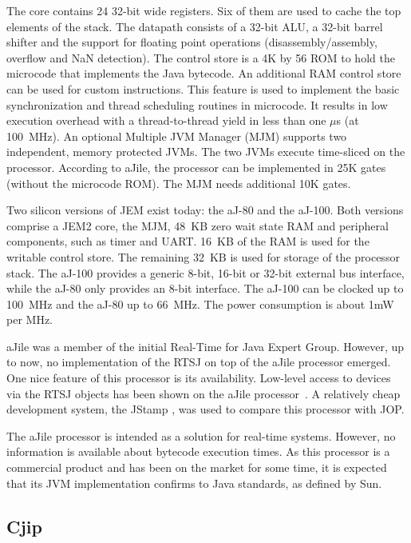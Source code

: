 The core contains 24 32-bit wide registers. Six of them are used to
cache the top elements of the stack. The datapath consists of a
32-bit ALU, a 32-bit barrel shifter and the support for floating
point operations (disassembly/assembly, overflow and NaN detection).
The control store is a 4K by 56 ROM to hold the microcode that
implements the Java bytecode. An additional RAM control store can be
used for custom instructions. This feature is used to implement the
basic synchronization and thread scheduling routines in microcode. It
results in low execution overhead with a thread-to-thread yield in
less than one $\mu$s (at 100~MHz). An optional Multiple JVM Manager
(MJM) supports two independent, memory protected JVMs. The two JVMs
execute time-sliced on the processor. According to aJile, the
processor can be implemented in 25K gates (without the microcode
ROM). The MJM needs additional 10K gates.

Two silicon versions of JEM exist today: the aJ-80 and the aJ-100.
Both versions comprise a JEM2 core, the MJM, 48~KB zero wait state
RAM and peripheral components, such as timer and UART. 16~KB of the
RAM is used for the writable control store. The remaining 32~KB is
used for storage of the processor stack. The aJ-100 provides a
generic 8-bit, 16-bit or 32-bit external bus interface, while the
aJ-80 only provides an 8-bit interface. The aJ-100 can be clocked up
to 100~MHz and the aJ-80 up to 66~MHz. The power consumption is about
1mW per MHz.

aJile was a member of the initial Real-Time for Java Expert Group.
However, up to now, no implementation of the RTSJ on top of the aJile
processor emerged. One nice feature of this processor is its
availability. Low-level access to devices via the RTSJ
 objects has been shown on the aJile
processor~\cite{conf/isorc/HardinFWB02}. A relatively cheap
development system, the JStamp \cite{JStamp}, was used to compare
this processor with JOP.

The aJile processor is intended as a solution for real-time systems.
However, no information is available about bytecode execution times.
As this processor is a commercial product and has been on the market
for some time, it is expected that its JVM implementation confirms to
Java standards, as defined by Sun.

\subsection{Cjip} 

